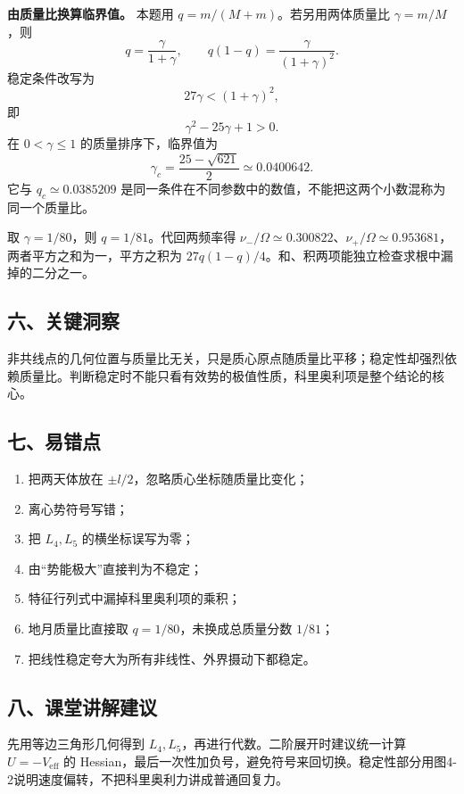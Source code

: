 \documentclass[12pt,a4paper,UTF8]{ctexart}
\newcommand{\tightlist}{\setlength{\itemsep}{0pt}\setlength{\parskip}{0pt}}
\begin{document}
\textbf{由质量比换算临界值。} 本题用 \(q=m/(M+m)\)。若另用两体质量比
\(\gamma=m/M\)，则 \[
q=\frac\gamma{1+\gamma},\qquad q(1-q)=\frac\gamma{(1+\gamma)^2}.
\] 稳定条件改写为 \[
27\gamma<(1+\gamma)^2,
\] 即 \[
\gamma^2-25\gamma+1>0.
\] 在 \(0<\gamma\le1\) 的质量排序下，临界值为 \[
\gamma_c=\frac{25-\sqrt{621}}2\simeq0.0400642.
\] 它与 \(q_c\simeq0.0385209\)
是同一条件在不同参数中的数值，不能把这两个小数混称为同一个质量比。

取 \(\gamma=1/80\)，则 \(q=1/81\)。代回两频率得
\(\nu_-/\Omega\simeq0.300822\)、\(\nu_+/\Omega\simeq0.953681\)，两者平方之和为一，平方之积为
\(27q(1-q)/4\)。和、积两项能独立检查求根中漏掉的二分之一。

\subsection{六、关键洞察}\label{ux516dux5173ux952eux6d1eux5bdf-3}

非共线点的几何位置与质量比无关，只是质心原点随质量比平移；稳定性却强烈依赖质量比。判断稳定时不能只看有效势的极值性质，科里奥利项是整个结论的核心。

\subsection{七、易错点}\label{ux4e03ux6613ux9519ux70b9-3}

\begin{enumerate}
\def\labelenumi{\arabic{enumi}.}
\tightlist
\item
  把两天体放在 \(\pm l/2\)，忽略质心坐标随质量比变化；
\item
  离心势符号写错；
\item
  把 \(L_4,L_5\) 的横坐标误写为零；
\item
  由``势能极大''直接判为不稳定；
\item
  特征行列式中漏掉科里奥利项的乘积；
\item
  地月质量比直接取 \(q=1/80\)，未换成总质量分数 \(1/81\)；
\item
  把线性稳定夸大为所有非线性、外界摄动下都稳定。
\end{enumerate}

\subsection{八、课堂讲解建议}\label{ux516bux8bfeux5802ux8bb2ux89e3ux5efaux8bae-3}

先用等边三角形几何得到 \(L_4,L_5\)，再进行代数。二阶展开时建议统一计算
\(U=-V_{\mathrm{eff}}\) 的
Hessian，最后一次性加负号，避免符号来回切换。稳定性部分用图4-2说明速度偏转，不把科里奥利力讲成普通回复力。
\end{document}
